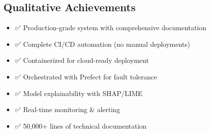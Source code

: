 \subsection{Qualitative Achievements}
\begin{itemize}
    \item ✅ Production-grade system with comprehensive documentation
    \item ✅ Complete CI/CD automation (no manual deployments)
    \item ✅ Containerized for cloud-ready deployment
    \item ✅ Orchestrated with Prefect for fault tolerance
    \item ✅ Model explainability with SHAP/LIME
    \item ✅ Real-time monitoring \& alerting
    \item ✅ 50,000+ lines of technical documentation
\end{itemize}

